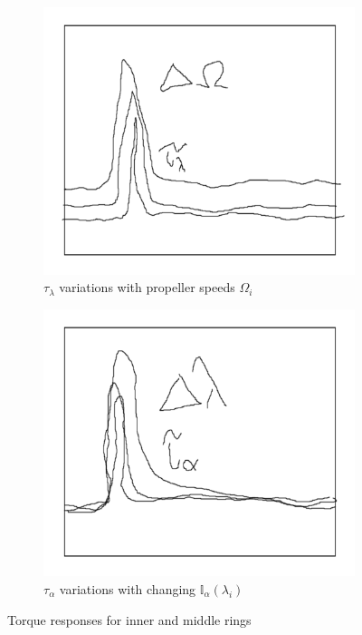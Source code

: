 \begin{figure}[hbtp]
\begin{subfigure}{0.2\textwidth}
\centering
\includegraphics[width=\textwidth]{graphs/tau-lambda}
\caption{$\tau_\lambda$ variations with propeller speeds $\Omega_i$}
\label{fig:tau-lambda}
\end{subfigure}
\begin{subfigure}{0.2\textwidth}
\centering
\includegraphics[width=\textwidth]{graphs/tau-alpha}
\caption{$\tau_\alpha$ variations with changing $\mathbb{I}_\alpha(\lambda_i)$}
\label{fig:tau-alpha}
\end{subfigure}
\vspace{-5pt}
\caption{Torque responses for inner and middle rings}
\vspace{-10pt}
\end{figure}
